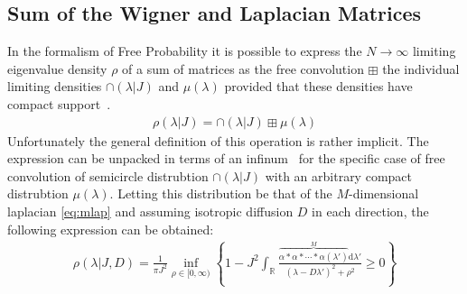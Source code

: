 \documentclass{article}[12pt]
\numberwithin{equation}{section}
\begin{document}
\subsection{Sum of the Wigner and Laplacian Matrices}
In the formalism of Free Probability it is possible to express the
$N\rightarrow\infty$ limiting eigenvalue density $\rho$ of a sum of
matrices as the free convolution $\boxplus$ the individual limiting
densities $\cap(\lambda|J)$ and $\mu(\lambda)$ provided that these
densities have compact support~\cite{Novak2012}.
\begin{align}
  \rho(\lambda|J)=\cap(\lambda|J)\boxplus\mu(\lambda)
  \label{eq:freeconv}
\end{align}
Unfortunately the general definition of this operation is rather implicit.
The expression can be unpacked in terms of an infinum~\cite{Biane_1997}
for the specific case of free convolution of semicircle distrubtion
$\cap(\lambda|J)$ with an arbitrary compact distrubtion $\mu(\lambda)$.
Letting this distribution be that of the $M$-dimensional laplacian
\eqref{eq:mlap} and assuming isotropic diffusion $D$ in each direction,
the following expression can be obtained:
\begin{align}
  \rho(\lambda|J,D)=
  \frac{1}{\pi J^2}
  \inf_{\rho\in[0,\infty)}
  \left\{
  1-J^2\int_{\mathbb{R}}\frac{\overbrace{
  \alpha*\alpha*\cdots*\alpha(\lambda')}^{M}\mathrm{d}\lambda'}{(\lambda-D\lambda')^2+\rho^2}
  \geq0
  \right\}
  \label{eq:inf}
\end{align}
\end{document}

